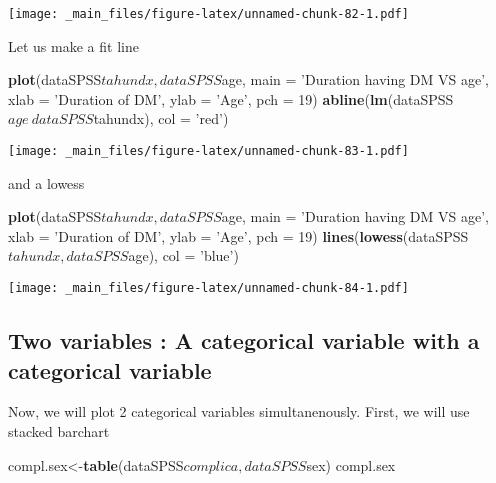 \documentclass[]{book}
\newenvironment{Shaded}{\begin{snugshade}}{\end{snugshade}}
\newcommand{\KeywordTok}[1]{\textcolor[rgb]{0.13,0.29,0.53}{\textbf{{#1}}}}
\newcommand{\DataTypeTok}[1]{\textcolor[rgb]{0.13,0.29,0.53}{{#1}}}
\newcommand{\DecValTok}[1]{\textcolor[rgb]{0.00,0.00,0.81}{{#1}}}
\newcommand{\StringTok}[1]{\textcolor[rgb]{0.31,0.60,0.02}{{#1}}}
\newcommand{\NormalTok}[1]{{#1}}
\theoremstyle{definition}
\theoremstyle{definition}
\theoremstyle{remark}
\begin{document}
\texttt{[image: \_main\_files/figure-latex/unnamed-chunk-82-1.pdf]}

Let us make a fit line

\begin{Shaded}
\begin{Highlighting}[]
\KeywordTok{plot}\NormalTok{(dataSPSS$tahundx, dataSPSS$age,}
     \DataTypeTok{main =} \StringTok{'Duration having DM VS age'}\NormalTok{,}
     \DataTypeTok{xlab =} \StringTok{'Duration of DM'}\NormalTok{, }\DataTypeTok{ylab =} \StringTok{'Age'}\NormalTok{,}
     \DataTypeTok{pch =} \DecValTok{19}\NormalTok{)}
\KeywordTok{abline}\NormalTok{(}\KeywordTok{lm}\NormalTok{(dataSPSS$age~dataSPSS$tahundx), }\DataTypeTok{col =} \StringTok{'red'}\NormalTok{)}
\end{Highlighting}
\end{Shaded}

\texttt{[image: \_main\_files/figure-latex/unnamed-chunk-83-1.pdf]}

and a lowess

\begin{Shaded}
\begin{Highlighting}[]
\KeywordTok{plot}\NormalTok{(dataSPSS$tahundx, dataSPSS$age,}
     \DataTypeTok{main =} \StringTok{'Duration having DM VS age'}\NormalTok{,}
     \DataTypeTok{xlab =} \StringTok{'Duration of DM'}\NormalTok{, }\DataTypeTok{ylab =} \StringTok{'Age'}\NormalTok{,}
     \DataTypeTok{pch =} \DecValTok{19}\NormalTok{)}
\KeywordTok{lines}\NormalTok{(}\KeywordTok{lowess}\NormalTok{(dataSPSS$tahundx,dataSPSS$age), }\DataTypeTok{col =} \StringTok{'blue'}\NormalTok{)}
\end{Highlighting}
\end{Shaded}

\texttt{[image: \_main\_files/figure-latex/unnamed-chunk-84-1.pdf]}

\subsection{Two variables : A categorical variable with a categorical
variable}\label{two-variables-a-categorical-variable-with-a-categorical-variable}

Now, we will plot 2 categorical variables simultanenously. First, we
will use stacked barchart

\begin{Shaded}
\begin{Highlighting}[]
\NormalTok{compl.sex<-}\KeywordTok{table}\NormalTok{(dataSPSS$complica,dataSPSS$sex)}
\NormalTok{compl.sex}
\end{Highlighting}
\end{Shaded}
\end{document}
